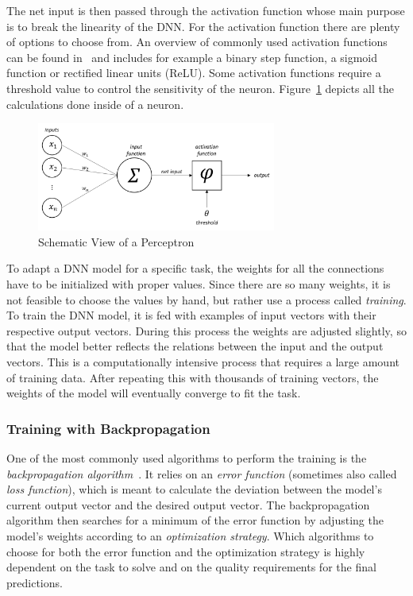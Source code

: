 The net input is then passed through the activation function whose main purpose is to break the linearity of the DNN. For the activation function there are plenty of options to choose from. An overview of commonly used activation functions can be found in~\cite{act_funcs18} and includes for example a binary step function, a sigmoid function or rectified linear units (ReLU). Some activation functions require a threshold value to control the sensitivity of the neuron. Figure~\ref{fig:perceptron} depicts all the calculations done inside of a neuron.

\begin{figure}[h]
    \centering
    \includegraphics[width=0.7\textwidth]{images/perceptron}
    \caption[Schematic View of a Perceptron]{Schematic View of a Perceptron~\cite[p.~257, modified]{praxiseinstieg_ml17}}
    \label{fig:perceptron}
\end{figure}

To adapt a DNN model for a specific task, the weights for all the connections have to be initialized with proper values. Since there are so many weights, it is not feasible to choose the values by hand, but rather use a process called \emph{training}. To train the DNN model, it is fed with examples of input vectors with their respective output vectors. During this process the weights are adjusted slightly, so that the model better reflects the relations between the input and the output vectors. This is a computationally intensive process that requires a large amount of training data. After repeating this with thousands of training vectors, the weights of the model will eventually converge to fit the task.

\subsubsection{Training with Backpropagation}
One of the most commonly used algorithms to perform the training is the \emph{backpropagation algorithm}~\cite[pp.~151ff]{nn_intro96}. It relies on an \emph{error function} (sometimes also called \emph{loss function}), which is meant to calculate the deviation between the model's current output vector and the desired output vector. The backpropagation algorithm then searches for a minimum of the error function by adjusting the model's weights according to an \emph{optimization strategy}. Which algorithms to choose for both the error function and the optimization strategy is highly dependent on the task to solve and on the quality requirements for the final predictions.

